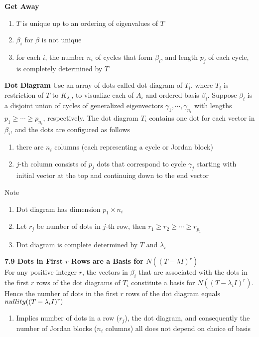 \documentclass[11pt]{article}
\begin{document}


\begin{defn*}
    \textbf{Get Away}
    \begin{enumerate}
        \item $T$ is unique up to an ordering of eigenvalues of $T$
        \item $\beta_i$ for $\beta$ is not unique
        \item for each $i$, the number $n_i$ of cycles that form $\beta_i$, and length $p_j$ of each cycle, is completely determined by $T$
    \end{enumerate}
\end{defn*}

\begin{defn*}
    \textbf{Dot Diagram} Use an array of dots called dot diagram of $T_i$, where $T_i$ is restriction of $T$ to $K_{\lambda_i}$, to visualize each of $A_i$ and ordered basis $\beta_i$. Suppose $\beta_i$ is a disjoint union of cycles of generalized eigenvectors $\gamma_1, \cdots, \gamma_{n_i}$ with lengths $p_1 \geq \cdots \geq p_{n_i}$, respectively. The dot diagram $T_i$ contains one dot for each vector in $\beta_i$, and the dots are configured as follows 
    \begin{enumerate}
        \item there are $n_i$ columns (each representing a cycle or Jordan block)
        \item $j$-th column consists of $p_j$ dots that correspond to cycle $\gamma_j$ starting with initial vector at the top and continuing down to the end vector
    \end{enumerate}
    Note
    \begin{enumerate}
        \item Dot diagram has dimension $p_1 \times n_i$
        \item Let $r_j$ be number of dots in $j$-th row, then $r_1 \geq r_2 \geq \cdots \geq r_{p_1}$
        \item Dot diagram is complete determined by $T$ and $\lambda_i$
    \end{enumerate}
\end{defn*}


\begin{theorem*}
    \textbf{7.9 Dots in First $r$ Rows are a Basis for $N((T-\lambda I)^r)$} \\ 
    For any positive integer $r$, the vectors in $\beta_i$ that are associated with the dots in the first $r$ rows of the dot diagrams of $T_i$ constitute a basis for $N((T-\lambda_i I)^r)$. Hence the number of dots in the first $r$ rows of the dot diagram equals $nullity((T-\lambda_i I)^r)$
    \begin{enumerate}
        \item Implies number of dots in a row ($r_j$), the dot diagram, and consequently the number of Jordan blocks ($n_i$ columns) all does not depend on choice of basis
    \end{enumerate}
\end{theorem*}
\end{document}
